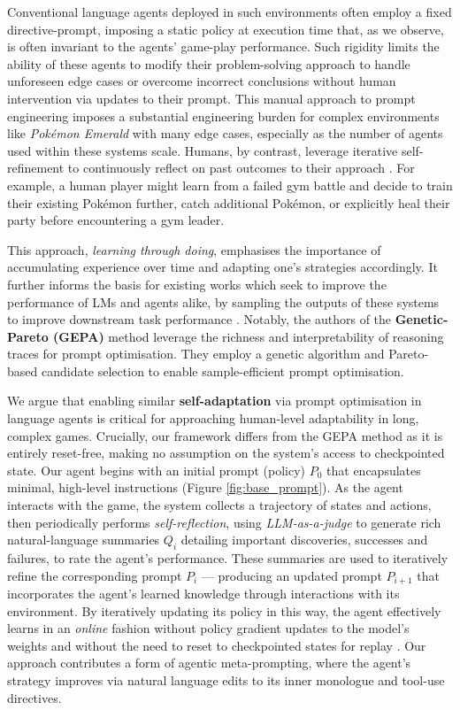 \documentclass[11pt]{article}
\begin{document}
Conventional language agents deployed in such environments often employ a fixed directive-prompt, imposing a static policy at execution time that, as we observe, is often invariant to the agents' game-play performance. Such rigidity limits the ability of these agents to modify their problem-solving approach to handle unforeseen edge cases or overcome incorrect conclusions without human intervention via updates to their prompt. This manual approach to prompt engineering imposes a substantial engineering burden for complex environments like \emph{Pokémon Emerald} with many edge cases, especially as the number of agents used within these systems scale. Humans, by contrast, leverage iterative self-refinement to continuously reflect on past outcomes to their approach \citep{madaan2023selfrefine}. For example, a human player might learn from a failed gym battle and decide to train their existing Pokémon further, catch additional Pokémon, or explicitly heal their party before encountering a gym leader. 

This approach, \emph{learning through doing}, emphasises the importance of accumulating experience over time and adapting one's strategies accordingly. It further informs the basis for existing works which seek to improve the performance of LMs and agents alike, by sampling the outputs of these systems to improve downstream task performance \citep{madaan2023selfrefine, agrawal2025gepa, zweiger2025seal}. Notably, the authors of the \textbf{Genetic-Pareto (GEPA)} method leverage the richness and interpretability of reasoning traces for prompt optimisation. They employ a genetic algorithm and Pareto-based candidate selection to enable sample-efficient prompt optimisation.

We argue that enabling similar \textbf{self-adaptation} via prompt optimisation in language agents is critical for approaching human-level adaptability in long, complex games. Crucially, our framework differs from the GEPA method as it is entirely reset-free, making no assumption on the system's access to checkpointed state. Our agent begins with an initial prompt (policy) $P_0$ that encapsulates minimal, high-level instructions (Figure \ref{fig:base_prompt}). As the agent interacts with the game, the system collects a trajectory of states and actions, then periodically performs \emph{self-reflection}, using \emph{LLM-as-a-judge} to generate rich natural-language summaries $Q_i$ detailing important discoveries, successes and failures, to rate the agent's performance. These summaries are used to iteratively refine the corresponding prompt $P_i$ — producing an updated prompt $P_{i+1}$ that incorporates the agent's learned knowledge through interactions with its environment. By iteratively updating its policy in this way, the agent effectively learns in an \emph{online} fashion without policy gradient updates to the model’s weights \citep{zweiger2025seal} and without the need to reset to checkpointed states for replay \citep{agrawal2025gepa}. Our approach contributes a form of agentic meta-prompting, where the agent’s strategy improves via natural language edits to its inner monologue and tool-use directives.
\end{document}
